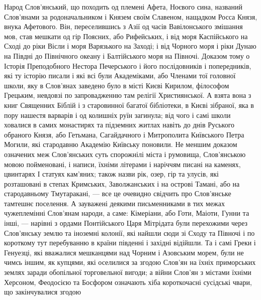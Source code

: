 Народ Слов'янський, що походить од племені Афета, Ноєвого сина, названий
Слов'янами за родоначальником і Князем своїм Славеном, нащадком Росса Князя,
внука Афетового. Він, переселившись з Азії од часів Вавілонського змішання мов,
став мешкати од гір Поясних, або Рифейських, і від моря Каспійського на Сході
до ріки Вісли і моря Варязького на Заході; і від Чорного моря і ріки Дунаю на
Півдні до Північного океану і Балтійського моря на Півночі. Доказом тому о
Історія Преподобного Нестора Печерського і його послідовників і попередників,
які ту історію писали і які всі були Академіками, або Членами тої головної
школи, яку в Слов'янах заведено було в місті Києві Кирилом, філософом Грецьким,
невдовзі по запровадженню там релігії Християнської. А взята вона з книг
Священних Біблій і з старовинної багатої бібліотеки, в Києві зібраної, яка в
пору нашестя варварів і од колишніх руїн загинула; від чого і самі школи
ховалися в самих монастирях та підземних житлах навіть до днів Руського
обраного Князя, або Гетьмана, Сагайдачного і Митрополита Київського Петра
Могили, які стародавню Академію Київську поновили.
Не меншим доказом означених меж Слов'янських суть спорожнілі міста і румовища,
Слов'янською мовою пойменовані, і написи, їхніми літерами і наріччям писані на
каменях, цвинтарях І статуях кам'яних; також назви рік, озер, гір та улусів,
які розташовані в степах Кримських, Заволжанських і на острові Тамані, або на
стародавньому Тмутаракані, — все це очевидно свідчить про Слов'янське тамтешнє
поселення. А зауважені деякими письменниками в тих межах чужеплемінні Слов'янам
народи, а саме: Кімеріани, або Готи, Маіоти, Гунни та інші, — нарівні з ордами
Понтійського Царя Мітрідата були перехожими через Слов'янську землю та іноземні
колонії, які найшли сюди зі Сходу та Півночі і по короткому тут перебуванню в
країни південні і західні відійшли. Та і самі Греки і Генуезці, які вважалися
мешканцями над Чорним і Азовським морем, були не чимсь іншим, як купцями, які
оселилися за згодою Слов'ян на їхніх приморських землях заради обопільної
торговельної вигоди; а війни Слов'ян з містами їхніми Херсоном, Феодосією та
Босфором означають хіба короткочасні сусідські чвари, що закінчувалися згодою
